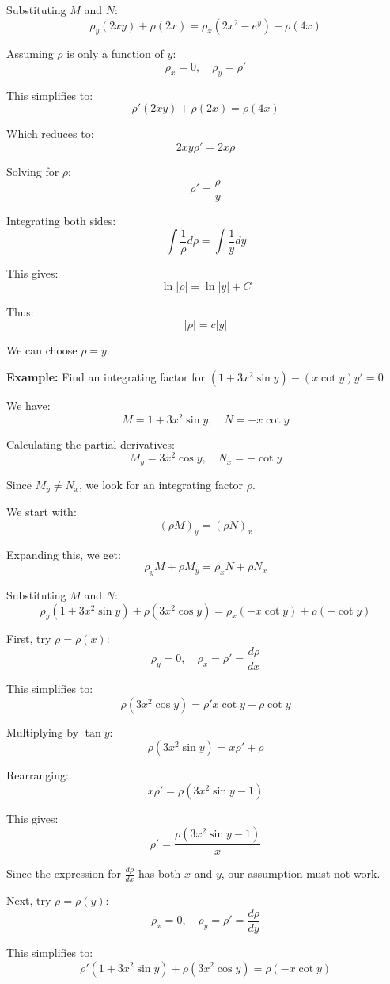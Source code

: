 \documentclass{article}
\begin{document}
Substituting \(M\) and \(N\):
\[
\rho_y (2xy) + \rho (2x) = \rho_x (2x^2 - e^y) + \rho (4x)
\]

Assuming \(\rho\) is only a function of \(y\):
\[
\rho_x = 0, \quad \rho_y = \rho'
\]

This simplifies to:
\[
\rho' (2xy) + \rho (2x) = \rho (4x)
\]

Which reduces to:
\[
2xy \rho' = 2x \rho
\]

Solving for \(\rho\):
\[
\rho' = \frac{\rho}{y}
\]

Integrating both sides:
\[
\int \frac{1}{\rho} d\rho = \int \frac{1}{y} dy
\]

This gives:
\[
\ln|\rho| = \ln|y| + C
\]

Thus:
\[
|\rho| = c|y|
\]

We can choose \(\rho = y\).



\textbf{Example:} Find an integrating factor for \((1 + 3x^2 \sin y) - (x \cot y) y' = 0\)

We have:
\[
M = 1 + 3x^2 \sin y, \quad N = -x \cot y
\]

Calculating the partial derivatives:
\[
M_y = 3x^2 \cos y, \quad N_x = -\cot y
\]

Since \(M_y \neq N_x\), we look for an integrating factor \(\rho\).

We start with:
\[
(\rho M)_y = (\rho N)_x
\]

Expanding this, we get:
\[
\rho_y M + \rho M_y = \rho_x N + \rho N_x
\]

Substituting \(M\) and \(N\):
\[
\rho_y (1 + 3x^2 \sin y) + \rho (3x^2 \cos y) = \rho_x (-x \cot y) + \rho (-\cot y)
\]

First, try \(\rho = \rho(x)\):
\[
\rho_y = 0, \quad \rho_x = \rho' = \frac{d\rho}{dx}
\]

This simplifies to:
\[
\rho (3x^2 \cos y) = \rho' x \cot y + \rho \cot y
\]

Multiplying by \(\tan y\):
\[
\rho (3x^2 \sin y) = x \rho' + \rho
\]

Rearranging:
\[
x \rho' = \rho (3x^2 \sin y - 1)
\]

This gives:
\[
\rho' = \frac{\rho (3x^2 \sin y - 1)}{x}
\]

Since the expression for \(\frac{d\rho}{dx}\) has both \(x\) and \(y\), our assumption must not work.

Next, try \(\rho = \rho(y)\):
\[
\rho_x = 0, \quad \rho_y = \rho' = \frac{d\rho}{dy}
\]

This simplifies to:
\[
\rho' (1 + 3x^2 \sin y) + \rho (3x^2 \cos y) = \rho (-x \cot y)
\]
\end{document}
